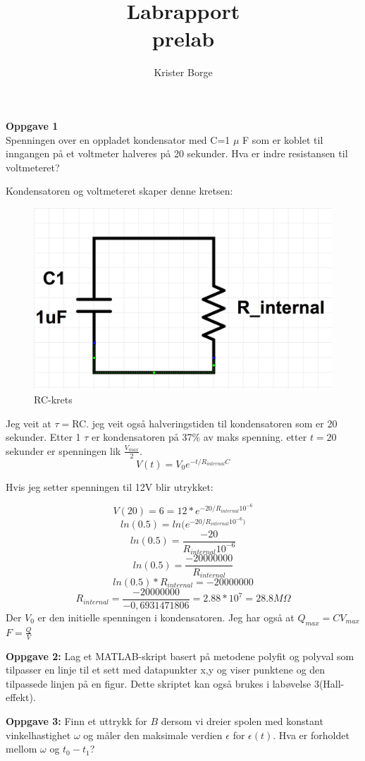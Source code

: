 \documentclass[12pt,a4paper,leqno]{report}
\author{Krister Borge}
\title{Labrapport \\ \small{prelab}}
\begin{document}
\maketitle
\textbf{Oppgave 1}
\\ Spenningen over en oppladet kondensator med C=1 $\mu$ F
som er koblet til inngangen på et voltmeter halveres på 20 sekunder. Hva er indre resistansen til voltmeteret?

Kondensatoren og voltmeteret skaper denne kretsen:
\begin{figure}[H]
\caption{RC-krets}
\centering
\includegraphics[width=\textwidth]{RC-cirquit.jpg}
\end{figure}
Jeg veit at $\tau=$RC. jeg veit også halveringstiden til kondensatoren som er 20 sekunder. Etter  1 $\tau$  er kondensatoren på 37\% av maks spenning. etter $t=20$ sekunder er spenningen lik $\frac{V_{max}}{2}$.
$$
V(t)=V_0e^{-t/R_{internal}C}
$$

Hvis jeg setter spenningen til 12V blir utrykket:


$$
V(20)=6=12*e^{-20/R_{internal}10^{-6}}
$$
$$
ln(0.5)=ln(e^{-20/R_{internal}10^{-6})}
$$
$$
ln(0.5)=\frac{-20}{R_{internal}10^{-6}}
$$
$$
ln(0.5)=\frac{-20000000}{R_{internal}}
$$
$$
ln(0.5)*R_{internal}=-20000000
$$
$$
R_{internal}=\frac{-20000000}{-0,6931471806}=2.88*10^7=28.8M\Omega
$$
Der $V_0$ er den initielle spenningen i kondensatoren.
Jeg har også at $Q_{max}=CV_{max}$
$F=\frac{Q}{V}$ 

\textbf{Oppgave 2:} 
Lag et MATLAB-skript basert på metodene polyfit og polyval som tilpasser en linje til et sett med datapunkter x,y og viser punktene og den tilpassede linjen på en figur. Dette skriptet kan også brukes i labøvelse 3(Hall-effekt).

\textbf{Oppgave 3:} 
Finn et uttrykk for $B$ dersom vi dreier spolen med konstant vinkelhastighet $\omega$ og måler den maksimale verdien $\epsilon$ for $\epsilon(t)$. Hva er forholdet mellom 
$\omega$ og $t_0-t_1$?
\end{document}
